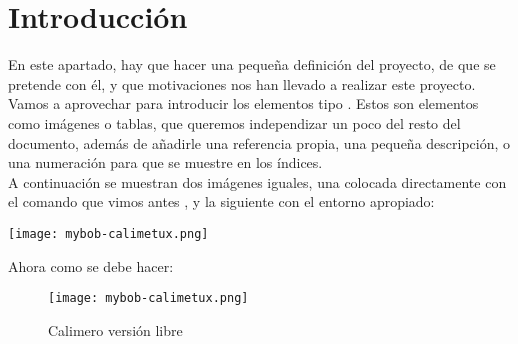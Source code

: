 

\section{Introducción}

En este apartado, hay que hacer una pequeña definición del proyecto,
de que se pretende con él, y que motivaciones nos han llevado a
realizar este proyecto.\\

Vamos a aprovechar para introducir los elementos tipo
. Estos son elementos como imágenes o tablas, que
queremos independizar un poco del resto del documento, además de
añadirle una referencia propia, una pequeña descripción, o una
numeración para que se muestre en los índices.\\

A continuación se muestran dos imágenes iguales, una colocada
directamente con el comando que vimos antes
, y la siguiente con el entorno
apropiado:

\begin{center}
\texttt{[image: mybob-calimetux.png]}
\end{center}

Ahora como se debe hacer:

\begin{figure}[H] %
  
  \label{cal-tux} %
  \begin{center}
    \texttt{[image: mybob-calimetux.png]}
  \end{center}
  \caption{Calimero versión libre}
\end{figure}

